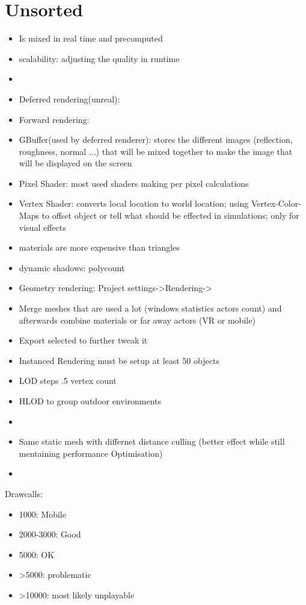 \documentclass{scrbook}
\begin{document}
        \section{Unsorted}
        \begin{itemize}
            \item Is mixed in real time and precomputed
            \item scalability: adjusting the quality in runtime
            \item 
            \item Deferred rendering(unreal): 
            \item Forward rendering: 
            \item GBuffer(used by deferred renderer): stores the different images (reflection, roughness, normal ...) that will be mixed together to make the image that will be displayed on the screen
            \item Pixel Shader: most used shaders making per pixel calculations
            \item Vertex Shader: converts local location to world location; using Vertex-Color-Maps to offset object or tell what should be effected in simulations; only for visual effects
            \item materials are more expensive than triangles
            \item dynamic shadows: polycount
            \item Geometry rendering: Project settings->Rendering->
            \item Merge meshes that are used a lot (windows statistics actors count) and afterwards combine materials or far away actors (VR or mobile)
            \item Export selected to further tweak it
            \item Instanced Rendering must be setup at least 50 objects
            \item LOD steps .5 vertex count
            \item HLOD to group outdoor environments
            \item 
            \item Same static mesh with differnet distance culling (better effect while still mentaining performance Optimisation)
            \item 
        \end{itemize}
\bigskip        
        Drawcalls:
        \begin{itemize}
            \item 1000: Mobile
            \item 2000-3000: Good
            \item 5000: OK
            \item >5000: problematic
            \item >10000: most likely unplayable
        \end{itemize}
\bigskip
\end{document}
